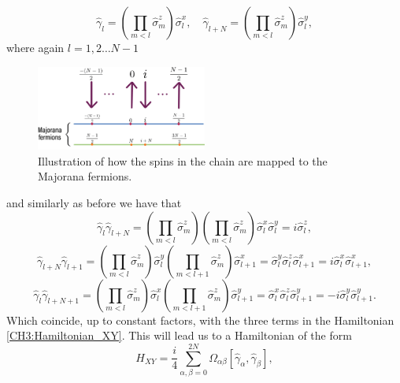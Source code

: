 \begin{equation}
\hat{\gamma}_{l}=\left(\prod_{m<l} \hat{\sigma}_{m}^{z}\right) \hat{\sigma}_{l}^{x}, \quad \hat{\gamma}_{l+N}=\left(\prod_{m<l} \hat{\sigma}_{m}^{z}\right) \hat{\sigma}_{l}^{y},
\end{equation}
where again $l=1,2\ldots N-1$
\begin{figure}[H]
    \centering
    \includegraphics[width=0.5\textwidth]{Figures/ecuacion.png}
    \caption{Illustration of how the spins in the chain are mapped to the Majorana fermions.}
    \label{majorana fermions}
\end{figure}
and similarly as before we have that
\begin{equation}
\hat{\gamma}_{l} \hat{\gamma}_{l+N}=\left(\prod_{m<l} \hat{\sigma}_{m}^{z}\right)\left(\prod_{m<l} \hat{\sigma}_{m}^{z}\right) \hat{\sigma}_{l}^{x} \hat{\sigma}_{l}^{y}=i \hat{\sigma}_{l}^{z},
\end{equation}
\begin{equation}
\hat{\gamma}_{l+N} \hat{\gamma}_{l+1}=\left(\prod_{m<l} \hat{\sigma}_{m}^{z}\right) \hat{\sigma}_{l}^{y}\left(\prod_{m<l+1} \hat{\sigma}_{m}^{z}\right) \hat{\sigma}_{l+1}^{x}=\hat{\sigma}_{l}^{y} \hat{\sigma}_{l}^{z} \hat{\sigma}_{l+1}^{x}=i \hat{\sigma}_{l}^{x} \hat{\sigma}_{l+1}^{x},
\end{equation}
\begin{equation}
\hat{\gamma}_{l} \hat{\gamma}_{l+N+1}=\left(\prod_{m<l} \hat{\sigma}_{m}^{z}\right) \hat{\sigma}_{l}^{x}\left(\prod_{m<l+1} \hat{\sigma}_{m}^{z}\right) \hat{\sigma}_{l+1}^{y}=\hat{\sigma}_{l}^{x} \hat{\sigma}_{l}^{z} \hat{\sigma}_{l+1}^{y}=-i \hat{\sigma}_{l}^{y} \hat{\sigma}_{l+1}^{y}.
\end{equation}
Which coincide, up to constant factors, with the three terms in the Hamiltonian \eqref{CH3:Hamiltonian_XY}. This will lead us to a Hamiltonian of the form\cite{botero_bcs-like_2004,latorre_ground_2004}
\begin{equation}
H_{X Y}=\frac{i}{4} \sum_{\alpha, \beta=0}^{2 N} \Omega_{\alpha \beta}\left[\hat{\gamma}_{\alpha}, \hat{\gamma}_{\beta}\right],
\label{CH3:Hamiltonian_to_diagonalise}
\end{equation}
